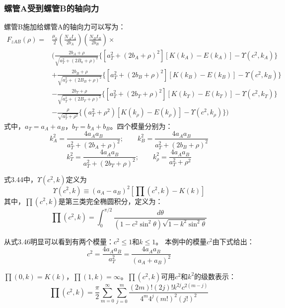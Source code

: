 \subsubsection{螺管A受到螺管B的轴向力}
螺管B施加给螺管A的轴向力可以写为：
\begin{equation}
\begin{split}
F_{zAB}(\rho)=&\frac{\mu_0}{2}\left(\frac{N_A I_A}{2b_A}\right)\left(\frac{N_B I_B}{2b_B}\right)\times \\
&\bigg(\frac{2b_A+\rho}{\sqrt{a_T^2+(2B_a+\rho)^2}} \{[a_T^2+(2b_A+\rho)^2][K(k_{A})-E(k_{A})]-\Upsilon(c^2,k_A)\}\\
&+\frac{2b_B+\rho}{\sqrt{a_T^2+(2B_B+\rho)^2}} \{[a_T^2+(2b_B+\rho)^2][K(k_{B})-E(k_{B})]-\Upsilon(c^2,k_B) \}\\
&-\frac{2b_T+\rho}{\sqrt{a_T^2+(2B_T+\rho)^2}} \{[a_T^2+(2b_T+\rho)^2][K(k_{T})-E(k_{T})]-\Upsilon(c^2,k_T) \}\\
&-\frac{\rho}{\sqrt{a_T^2+\rho^2}}\{(a_T^2+\rho^2)[K(k_\rho)-E(k_\rho)]-\Upsilon(c^2,k_\rho)\}\bigg)
\end{split}
\end{equation}
式中，$a_T=a_A+a_B$，$b_T=b_A+b_B$。四个模量分别为：
$$k_{A}^2=\frac{4a_A a_B}{a_T^2+(2b_A+\rho)^2} ;\qquad k_{B}^2=\frac{4a_A a_B}{a_T^2+(2b_B+\rho)^2} $$
$$k_{T}^2=\frac{4a_A a_B}{a_T^2+(2b_T+\rho)^2} ;\qquad k_{\rho}^2=\frac{4a_A a_B}{a_T^2+\rho^2} $$

式3.44中，$\Upsilon(c^2,k)$定义为
\begin{equation}
  \Upsilon(c^2,k)\equiv(a_A-a_B)^2\left[\prod(c^2,k)-K(k)\right]
\end{equation}
其中，$\prod(c^2,k)$是第三类完全椭圆积分，定义为：
\begin{equation}
\prod(c^2,k)=\int_{0}^{\pi/2}\frac{d\theta}{(1-c^2\sin^2\theta)\sqrt{1-k^2\sin^2\theta}}
\end{equation}

从式3.46明显可以看到有两个模量：$c^2\le 1$和$k\le 1$。
本例中的模量$c^2$由下式给出：
\begin{equation}
c^2=\frac{4a_A a_B}{a_T^2}=\frac{4a_A a_B}{(a_A+a_B)^2}
\end{equation}

$\prod(0,k)=K(k)$，$\prod(1,k)=\infty$。$\prod(c^2,k)$可用$c^2$和$k^2$的级数表示：
\begin{equation}
\prod(c^2,k)=\frac{\pi}{2}\sum_{m=0}^{\infty} \sum_{j=0}^{m} \frac{(2m)!(2j)!k^{2j}c^{2(m-j)}}{4^m 4^j (m!)^2(j!)^2}
\end{equation}


